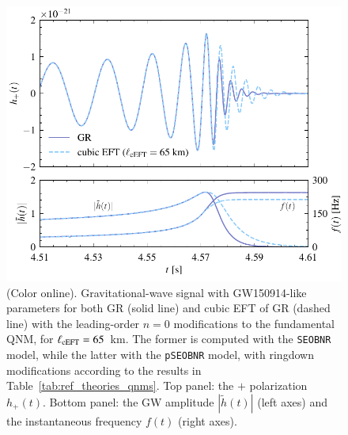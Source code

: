 \documentclass[twocolumn,
               prd,
               aps,
               superscriptaddress,
               tightenlines,
               nofootinbib,
               eqsecnum,
               amsfonts,
               amsmath,
               longbibliography]{revtex4-1}
\newcommand{\pSEOB}{\texttt{pSEOBNR}}
\newcommand{\SEOB}{\texttt{SEOBNR}}
\begin{document}
\begin{figure}[t]
\includegraphics[width=\columnwidth]{figs/example_waveform_cubicEFT.pdf}
\caption{(Color online). Gravitational-wave signal with GW150914-like parameters
for both GR (solid line) and cubic EFT of GR (dashed line) with the leading-order
$n=0$ modifications to the fundamental QNM, for $\ell_{\rm cEFT} = 65$~km.
%
The former is computed with the \SEOB{} model, while the latter with the
\pSEOB{} model, with ringdown modifications according to the results in
Table~\ref{tab:ref_theories_qnms}.
%
Top panel: the $+$ polarization $h_{+}(t)$. Bottom panel: the GW amplitude
$|\tilde{h}(t)|$ (left axes) and the instantaneous frequency $f(t)$ (right axes).
}
\label{fig:example_waveform}
\end{figure}
\end{document}
